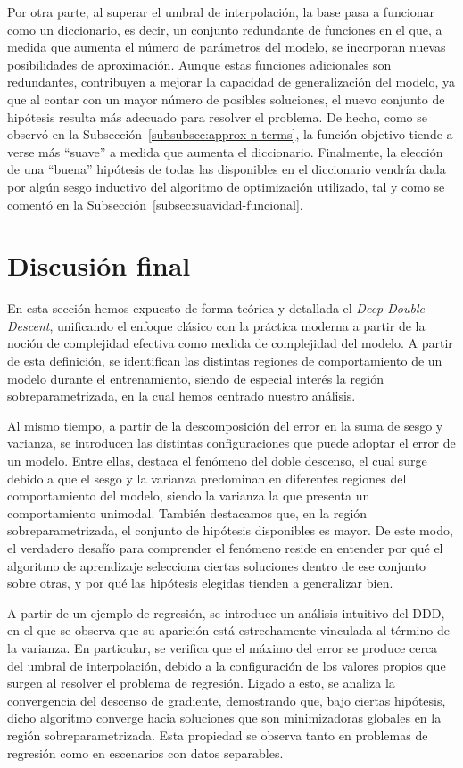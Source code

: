 Por otra parte, al superar el umbral de interpolación, la base pasa a funcionar como un diccionario, es decir, un conjunto redundante de funciones en el que, a medida que aumenta el número de parámetros del modelo, se incorporan nuevas posibilidades de aproximación. Aunque estas funciones adicionales son redundantes, contribuyen a mejorar la capacidad de generalización del modelo, ya que al contar con un mayor número de posibles soluciones, el nuevo conjunto de hipótesis resulta más adecuado para resolver el problema. De hecho, como se observó en la Subsección~\ref{subsubsec:approx-n-terms}, la función objetivo tiende a verse más “suave” a medida que aumenta el diccionario. Finalmente, la elección de una ``buena'' hipótesis de todas las disponibles en el diccionario vendría dada por algún sesgo inductivo del algoritmo de optimización utilizado, tal y como se comentó en la Subsección~\ref{subsec:suavidad-funcional}.

\section{Discusión final}\label{sec:conclusion-matematica}

En esta sección hemos expuesto de forma teórica y detallada el \textit{Deep Double Descent}, unificando el enfoque clásico con la práctica moderna a partir de la noción de complejidad efectiva como medida de complejidad del modelo. A partir de esta definición, se identifican las distintas regiones de comportamiento de un modelo durante el entrenamiento, siendo de especial interés la región sobreparametrizada, en la cual hemos centrado nuestro análisis.

Al mismo tiempo, a partir de la descomposición del error en la suma de sesgo y varianza, se introducen las distintas configuraciones que puede adoptar el error de un modelo. Entre ellas, destaca el fenómeno del doble descenso, el cual surge debido a que el sesgo y la varianza predominan en diferentes regiones del comportamiento del modelo, siendo la varianza la que presenta un comportamiento unimodal. También destacamos que, en la región sobreparametrizada, el conjunto de hipótesis disponibles es mayor. De este modo, el verdadero desafío para comprender el fenómeno reside en entender por qué el algoritmo de aprendizaje selecciona ciertas soluciones dentro de ese conjunto sobre otras, y por qué las hipótesis elegidas tienden a generalizar bien.

A partir de un ejemplo de regresión, se introduce un análisis intuitivo del DDD, en el que se observa que su aparición está estrechamente vinculada al término de la varianza. En particular, se verifica que el máximo del error se produce cerca del umbral de interpolación, debido a la configuración de los valores propios que surgen al resolver el problema de regresión. Ligado a esto, se analiza la convergencia del descenso de gradiente, demostrando que, bajo ciertas hipótesis, dicho algoritmo converge hacia soluciones que son minimizadoras globales en la región sobreparametrizada. Esta propiedad se observa tanto en problemas de regresión como en escenarios con datos separables.

